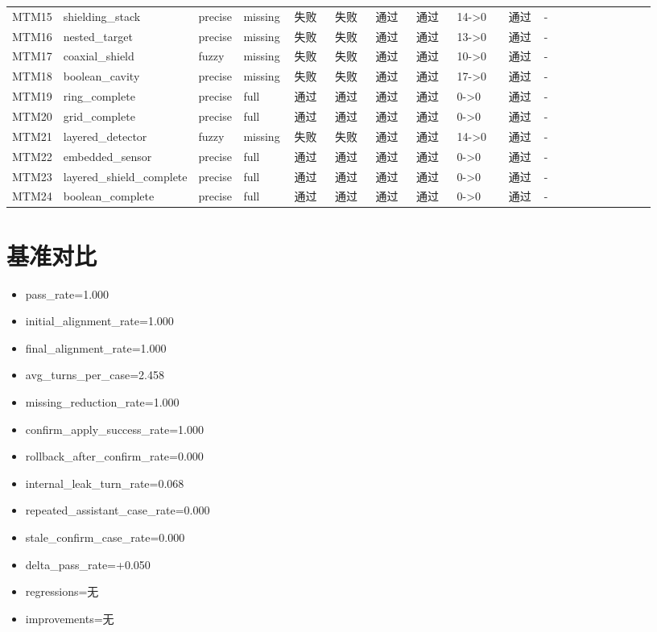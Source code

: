 \documentclass[11pt]{ctexart}
\begin{document}
\begin{longtable}{p{0.06\linewidth}p{0.08\linewidth}p{0.07\linewidth}p{0.08\linewidth}p{0.07\linewidth}p{0.07\linewidth}p{0.07\linewidth}p{0.07\linewidth}p{0.09\linewidth}p{0.06\linewidth}p{0.21\linewidth}}
MTM15 & shielding\_stack & precise & missing & 失败 & 失败 & 通过 & 通过 & 14->0 & 通过 & - \\
MTM16 & nested\_target & precise & missing & 失败 & 失败 & 通过 & 通过 & 13->0 & 通过 & - \\
MTM17 & coaxial\_shield & fuzzy & missing & 失败 & 失败 & 通过 & 通过 & 10->0 & 通过 & - \\
MTM18 & boolean\_cavity & precise & missing & 失败 & 失败 & 通过 & 通过 & 17->0 & 通过 & - \\
MTM19 & ring\_complete & precise & full & 通过 & 通过 & 通过 & 通过 & 0->0 & 通过 & - \\
MTM20 & grid\_complete & precise & full & 通过 & 通过 & 通过 & 通过 & 0->0 & 通过 & - \\
MTM21 & layered\_detector & fuzzy & missing & 失败 & 失败 & 通过 & 通过 & 14->0 & 通过 & - \\
MTM22 & embedded\_sensor & precise & full & 通过 & 通过 & 通过 & 通过 & 0->0 & 通过 & - \\
MTM23 & layered\_shield\_complete & precise & full & 通过 & 通过 & 通过 & 通过 & 0->0 & 通过 & - \\
MTM24 & boolean\_complete & precise & full & 通过 & 通过 & 通过 & 通过 & 0->0 & 通过 & - \\
\bottomrule
\end{longtable}
\section{基准对比}
\begin{itemize}
\item pass\_rate=1.000
\item initial\_alignment\_rate=1.000
\item final\_alignment\_rate=1.000
\item avg\_turns\_per\_case=2.458
\item missing\_reduction\_rate=1.000
\item confirm\_apply\_success\_rate=1.000
\item rollback\_after\_confirm\_rate=0.000
\item internal\_leak\_turn\_rate=0.068
\item repeated\_assistant\_case\_rate=0.000
\item stale\_confirm\_case\_rate=0.000
\item delta\_pass\_rate=+0.050
\item regressions=无
\item improvements=无
\end{itemize}
\appendix
\end{document}
